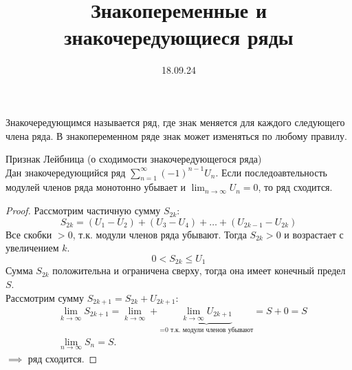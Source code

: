 

\title{Знакопеременные и знакочередующиеся ряды}
\date{18.09.24}


\maketitle
\begin{remark}
    Знакочередующимся называется ряд, где знак меняется 
    для каждого следующего члена ряда. В знакопеременном ряде 
    знак может изменяться по любому правилу.
\end{remark}

\begin{thm}
    Признак Лейбница (о сходимости знакочередующегося ряда)\\
    Дан знакочередующийся ряд \(\sum_{n=1}^{\infty} (-1)^{n-1} U_{n}\). 
    Если последоавтельность модулей членов ряда монотонно убывает 
    и \(\lim_{n\to\infty} U_{n}=0\), то ряд сходится.
    \begin{proof}
        Рассмотрим частичную сумму \(S_{2k}\):
        \begin{equation}
            S_{2k} = (U_{1} - U_{2}) + (U_{3} - U_{4}) + 
            \dots + (U_{2k - 1} - U_{2k})
        \end{equation}
        Все скобки \(>0\), т.к. модули членов ряда убывают. 
        Тогда \(S_{2k} > 0\) и возрастает с увеличением \(k\).
        \begin{equation}
            0 < S_{2k} \leq U_{1}
        \end{equation}
        Сумма \(S_{2k}\) положительна и ограничена сверху, 
        тогда она имеет конечный предел \(S\). \\
        Рассмотрим сумму \(S_{2k+1} = S_{2k} + U_{2k+1}\):
        \begin{equation}
            \begin{align*}
                &\lim_{k\to\infty} S_{2k+1} = \lim_{k\to\infty} + \underbrace{\lim_{k\to\infty}U_{2k+1}}_{\text{=0 т.к. модули членов убывают}} = S+0= S\\
                &\lim_{n\to\infty}S_{n} = S.
            \end{align*}
        \end{equation}
        \(\implies\) ряд сходится.
    \end{proof}

    \begin{corollary}
        
    \end{corollary}
\end{thm}



